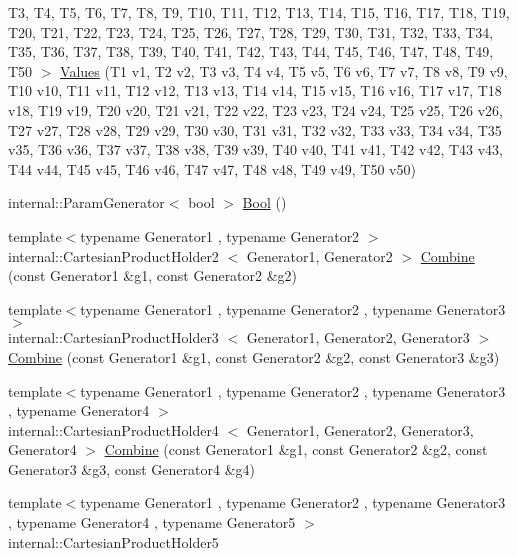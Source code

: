 \begin{DoxyCompactItemize}
\-T3, \-T4, \-T5, \-T6, \-T7, \-T8, \-T9, \*
\-T10, \-T11, \-T12, \-T13, \-T14, \-T15, \*
\-T16, \-T17, \-T18, \-T19, \-T20, \-T21, \*
\-T22, \-T23, \-T24, \-T25, \-T26, \-T27, \*
\-T28, \-T29, \-T30, \-T31, \-T32, \-T33, \*
\-T34, \-T35, \-T36, \-T37, \-T38, \-T39, \*
\-T40, \-T41, \-T42, \-T43, \-T44, \-T45, \*
\-T46, \-T47, \-T48, \-T49, \-T50 $>$ \hyperlink{namespacetesting_a7b6008393a1fa7b55b07fbad67c1c811}{\-Values} (\-T1 v1, \-T2 v2, \-T3 v3, \-T4 v4, \-T5 v5, \-T6 v6, \-T7 v7, \-T8 v8, \-T9 v9, \-T10 v10, \-T11 v11, \-T12 v12, \-T13 v13, \-T14 v14, \-T15 v15, \-T16 v16, \-T17 v17, \-T18 v18, \-T19 v19, \-T20 v20, \-T21 v21, \-T22 v22, \-T23 v23, \-T24 v24, \-T25 v25, \-T26 v26, \-T27 v27, \-T28 v28, \-T29 v29, \-T30 v30, \-T31 v31, \-T32 v32, \-T33 v33, \-T34 v34, \-T35 v35, \-T36 v36, \-T37 v37, \-T38 v38, \-T39 v39, \-T40 v40, \-T41 v41, \-T42 v42, \-T43 v43, \-T44 v44, \-T45 v45, \-T46 v46, \-T47 v47, \-T48 v48, \-T49 v49, \-T50 v50)
\item 
internal\-::\-Param\-Generator$<$ bool $>$ \hyperlink{namespacetesting_aa9f9150ed43f949c8a6bacf3f04c03ce}{\-Bool} ()
\item 
{\footnotesize template$<$typename Generator1 , typename Generator2 $>$ }\\internal\-::\-Cartesian\-Product\-Holder2\*
$<$ \-Generator1, \-Generator2 $>$ \hyperlink{namespacetesting_a4917922963bacef3e301e67366c41df3}{\-Combine} (const \-Generator1 \&g1, const \-Generator2 \&g2)
\item 
{\footnotesize template$<$typename Generator1 , typename Generator2 , typename Generator3 $>$ }\\internal\-::\-Cartesian\-Product\-Holder3\*
$<$ \-Generator1, \-Generator2, \*
\-Generator3 $>$ \hyperlink{namespacetesting_a77b89180fd846e275236409d9704eda2}{\-Combine} (const \-Generator1 \&g1, const \-Generator2 \&g2, const \-Generator3 \&g3)
\item 
{\footnotesize template$<$typename Generator1 , typename Generator2 , typename Generator3 , typename Generator4 $>$ }\\internal\-::\-Cartesian\-Product\-Holder4\*
$<$ \-Generator1, \-Generator2, \*
\-Generator3, \-Generator4 $>$ \hyperlink{namespacetesting_abf420810fcd8190a98c2927862805a3f}{\-Combine} (const \-Generator1 \&g1, const \-Generator2 \&g2, const \-Generator3 \&g3, const \-Generator4 \&g4)
\item 
{\footnotesize template$<$typename Generator1 , typename Generator2 , typename Generator3 , typename Generator4 , typename Generator5 $>$ }\\internal\-::\-Cartesian\-Product\-Holder5\*

\end{DoxyCompactItemize}
